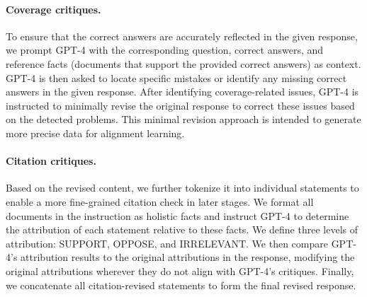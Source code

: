 \documentclass{article} %
\newcommand{\metric}[0]{\textsc{Trust-Score}}
\begin{document}
\paragraph{Coverage critiques.}
To ensure that the correct answers are accurately reflected in the given response, we prompt GPT-4 with the corresponding question, correct answers, and reference facts (documents that support the provided correct answers) as context. GPT-4 is then asked to locate specific mistakes or identify any missing correct answers in the given response. After identifying coverage-related issues, GPT-4 is instructed to minimally revise the original response to correct these issues based on the detected problems. This minimal revision approach is intended to generate more precise data for alignment learning.

\paragraph{Citation critiques.}
Based on the revised content, we further tokenize it into individual statements to enable a more fine-grained citation check in later stages. We format all documents in the instruction as holistic facts and instruct GPT-4 to determine the attribution of each statement relative to these facts. We define three levels of attribution: SUPPORT, OPPOSE, and IRRELEVANT. We then compare GPT-4's attribution results to the original attributions in the response, modifying the original attributions wherever they do not align with GPT-4's critiques. Finally, we concatenate all citation-revised statements to form the final revised response.







\end{document}
